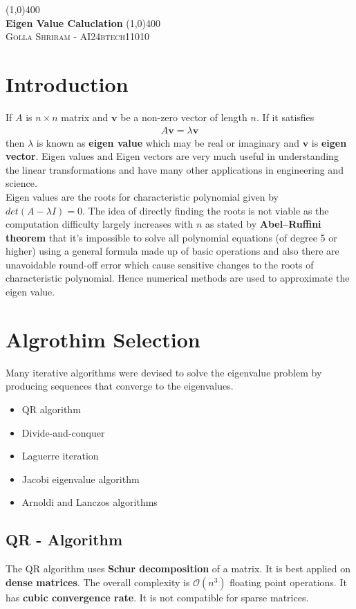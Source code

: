 \documentclass[pdflatex,sn-mathphys-num]{sn-jnl}
\begin{document}
\begin{titlepage}
  \begin{center}
      \line(1,0){400}\\
      \huge{\bfseries{Eigen Value Caluclation}}
        \line(1,0){400}\\
  
 \textsc{\small Golla Shriram - AI24btech11010}
\end{center}  
\hspace{2cm}
\section{Introduction}
If $A$ is $n\times n$ matrix and $\mathbf{v}$ be a non-zero vector of length $n$. If it satisfies 
   \begin{align}
       A\mathbf{v} = \lambda \mathbf{v}
   \end{align}  
then $\lambda$ is known as \textbf{eigen value} which may be real or imaginary and $\mathbf{v}$ is \textbf{eigen vector}. Eigen values and Eigen vectors are very much useful in understanding the linear transformations and have many other applications in engineering and science. 
\\

      Eigen values are the roots for characteristic polynomial given by  $det(A-\lambda I) = 0$. The idea of directly finding the roots  is not viable as the computation difficulty largely increases with $n$ as stated by \textbf{Abel–Ruffini theorem} that it's impossible to solve all polynomial equations (of degree 5 or higher) using a general formula made up of basic operations and also there are unavoidable round-off error which cause sensitive changes to the roots of characteristic polynomial. Hence numerical methods are used to approximate the eigen value. 
      

\section{Algrothim Selection}
 Many iterative algorithms were devised to solve the eigenvalue problem by producing sequences that converge to the eigenvalues. 
 \begin{itemize}
\item QR algorithm
\item  Divide-and-conquer
\item  Laguerre iteration
\item  Jacobi eigenvalue algorithm
\item  Arnoldi and Lanczos algorithms
\end{itemize}

\subsection{QR - Algorithm}
 The QR algorithm uses \textbf{Schur decomposition} of a matrix. It is best applied on \textbf{dense matrices}.  The overall complexity is $\mathcal{O}(n^3)$ floating point operations. It has \textbf{cubic convergence rate}. It is not compatible for sparse matrices.

 \end{titlepage}
\end{document}
